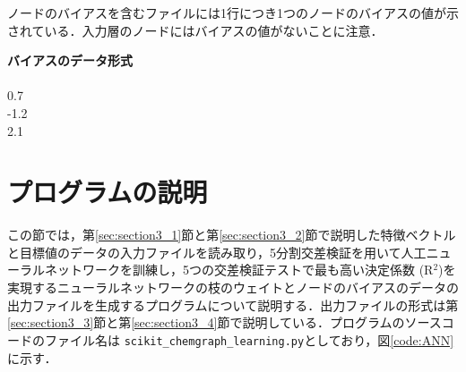 \documentclass[11pt,titlepage,dvipdfmx,twoside]{jarticle}
\begin{document}
ノードのバイアスを含むファイルには1行につき1つのノードのバイアスの値が示されている．入力層のノードにはバイアスの値がないことに注意．

\bigskip

\begin{oframed}
{\bf バイアスのデータ形式}\\\\
0.7\\
-1.2\\
2.1\\
\end{oframed}

\bigskip

\newpage

\section{プログラムの説明}
\label{sec:section4}

この節では，第\ref{sec:section3_1}節と第\ref{sec:section3_2}節で説明した特徴ベクトルと目標値のデータの入力ファイルを読み取り，5分割交差検証を用いて人工ニューラルネットワークを訓練し，5つの交差検証テストで最も高い決定係数 (R$^2$)を実現するニューラルネットワークの枝のウェイトとノードのバイアスのデータの出力ファイルを生成するプログラムについて説明する．出力ファイルの形式は第\ref{sec:section3_3}節と第\ref{sec:section3_4}節で説明している．プログラムのソースコードのファイル名は {\tt scikit\_chemgraph\_learning.py}としており，図\ref{code:ANN}に示す．

\bigskip\bigskip
\end{document}

